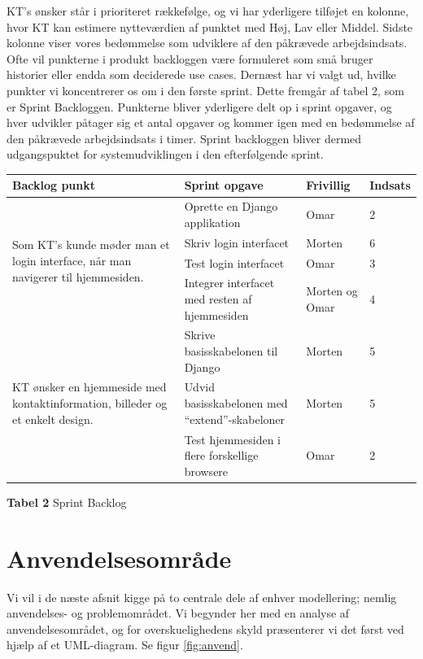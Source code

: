 \documentclass[12pt]{article}   %
\begin{document}
KT's ønsker står i prioriteret rækkefølge, og vi har yderligere tilføjet en
kolonne, hvor KT kan estimere nytteværdien af punktet med Høj, Lav eller
Middel. Sidste kolonne viser vores bedømmelse som udviklere af den påkrævede
arbejdsindsats. Ofte vil punkterne i produkt backloggen være formuleret som
små bruger historier eller endda som deciderede use cases. Dernæst har vi
valgt ud, hvilke punkter vi koncentrerer os om i den første sprint. Dette
fremgår af tabel 2, som er Sprint Backloggen. Punkterne bliver yderligere
delt op i sprint opgaver, og hver udvikler påtager sig et antal opgaver og
kommer igen med en bedømmelse af den påkrævede arbejdsindsats i timer. Sprint
backloggen bliver dermed udgangspuktet for systemudviklingen i den
efterfølgende sprint. 


\begin{center}
	\begin{tabular}{|l|p{4cm}|l|l|}
		\hline
		Backlog punkt & Sprint opgave & Frivillig & Indsats\\ \hline
		\multirow{4}{4cm}{Som KT's kunde møder man et login interface,
		når man navigerer til hjemmesiden.} & Oprette en Django
		applikation & Omar  & 2 \\
		& Skriv login interfacet & Morten & 6 \\
		& Test login interfacet & Omar & 3 \\
		& Integrer interfacet med resten af hjemmesiden & Morten og Omar
		& 4 \\ \hline
		\multirow{3}{4cm}{KT ønsker en hjemmeside med
		kontaktinformation, billeder og et enkelt design.} &
		Skrive basisskabelonen til Django & Morten & 5 \\
		& Udvid basisskabelonen med ``extend''-skabeloner & Morten & 5
		\\ & Test hjemmesiden i flere forskellige browsere & Omar & 2 \\
		\hline

	\end{tabular}
\end{center}

\begin{center}
\textbf{Tabel 2} Sprint Backlog
\end{center}

\vspace{0.5cm}
		

\section{Anvendelsesområde}
Vi vil i de næste afsnit kigge på to centrale dele af enhver modellering;
nemlig anvendelses- og problemområdet. Vi begynder her med en analyse af
anvendelsesområdet, og for overskuelighedens skyld præsenterer vi det først
ved hjælp af et UML-diagram. Se figur \ref{fig:anvend}.\\
\end{document}
